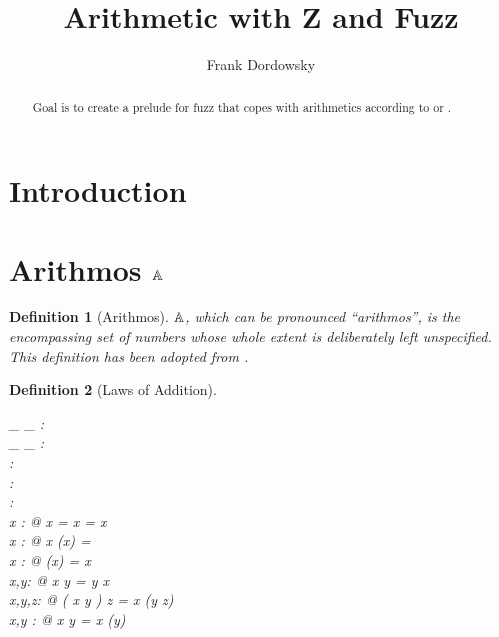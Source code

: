 \documentclass[12pt]{scrartcl}
\newtheorem{zdef}{Definition}[section]
\begin{document}
\title{Arithmetic with Z and Fuzz}

\author{Frank Dordowsky}

\maketitle

\begin{abstract}
Goal is to create a prelude for fuzz that copes with arithmetics
according to \cite{Valentine2012} or \cite{Arthan1996}.
\end{abstract}

\tableofcontents

\section{Introduction}
\label{sec:intro}

\section{Arithmos $\mathbb{A}$}
\label{sec:arithmos}

\begin{zdef}[Arithmos]
  \label{zdef:arithmos}
  $\mathbb{A}$, which can be pronounced “arithmos”, is the encompassing
  set of numbers whose whole extent is deliberately left
  unspecified. This definition has been adopted from
  \cite{Valentine2012}. 
  \begin{zed}
    [\arithmos] 
  \end{zed}
\end{zdef}

\begin{zdef}[Laws of Addition]
  \label{zdef:laws-addition}
  \begin{axdef}
    \_ \aplus \_ : \arithmos \cross \arithmos \fun \arithmos\\
    \_ \aminus \_ : \arithmos \cross \arithmos \fun \arithmos\\
    \aneg : \arithmos \fun \arithmos\\
    \azero : \arithmos\\
    \aone : \arithmos\\
    \where
    \forall x : \arithmos @ x \aplus \azero = \azero \aplus x = x \\
    \forall x : \arithmos @ x \aplus (\aneg x) = \azero \\
    \forall x : \arithmos @ \aneg (\aneg x) = x \\
    \forall x,y: \arithmos @ x \aplus y = y \aplus x \\
    \forall x,y,z: \arithmos @ ( x \aplus y ) \aplus z = x \aplus (y
    \aplus z) \\
    \forall x,y : \arithmos @ x \aminus y = x \aplus (\aneg y)\\
  \end{axdef}
\end{zdef}
\end{document}
